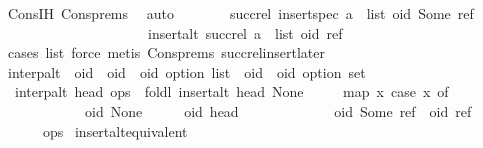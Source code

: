 \begin{isabellebody}
\ Cons{\isachardot}IH\ Cons{\isachardot}prems\ \isamarkupfalse%
\ auto\isanewline
\ \ \ \ \isamarkupfalse%
\ \isamarkupfalse%
\ {\isachardoublequoteopen}succ{\isacharunderscore}rel\ {\isacharparenleft}insert{\isacharunderscore}spec\ {\isacharparenleft}a\ {\isacharhash}\ list{\isacharparenright}\ {\isacharparenleft}oid{\isacharcomma}\ Some\ ref{\isacharparenright}{\isacharparenright}\ {\isacharequal}\isanewline
\ \ \ \ \ \ \ \ \ \ \ \ \ \ \ \ \ \ \ \ \ insert{\isacharunderscore}alt\ {\isacharparenleft}succ{\isacharunderscore}rel\ {\isacharparenleft}a\ {\isacharhash}\ list{\isacharparenright}{\isacharparenright}\ {\isacharparenleft}oid{\isacharcomma}\ ref{\isacharparenright}{\isachardoublequoteclose}\isanewline
\ \ \ \ \ \ \isamarkupfalse%
\ {\isacharparenleft}cases\ list{\isacharcomma}\ force{\isacharcomma}\ metis\ Cons{\isachardot}prems\ succ{\isacharunderscore}rel{\isacharunderscore}insert{\isacharunderscore}later{\isacharparenright}\isanewline
\ \ \isamarkupfalse%
\isanewline
{}\isamarkupfalse%
%
\endisatagproof
{\isafoldproof}%
%
\isadelimproof
\isanewline
%
\endisadelimproof
\isanewline
{}\isamarkupfalse%
\ interp{\isacharunderscore}alt\ {\isacharcolon}{\isacharcolon}\ {\isachardoublequoteopen}{\isacharprime}oid\ {\isasymRightarrow}\ {\isacharparenleft}{\isacharprime}oid\ {\isasymtimes}\ {\isacharprime}oid\ option{\isacharparenright}\ list\ {\isasymRightarrow}\ {\isacharparenleft}{\isacharprime}oid\ {\isasymtimes}\ {\isacharprime}oid\ option{\isacharparenright}\ set{\isachardoublequoteclose}\ \isanewline
\ \ {\isachardoublequoteopen}interp{\isacharunderscore}alt\ head\ ops\ {\isasymequiv}\ foldl\ insert{\isacharunderscore}alt\ {\isacharbraceleft}{\isacharparenleft}head{\isacharcomma}\ None{\isacharparenright}{\isacharbraceright}\isanewline
\ \ \ \ \ {\isacharparenleft}map\ {\isacharparenleft}{\isasymlambda}x{\isachardot}\ case\ x\ of\isanewline
\ \ \ \ \ \ \ \ \ \ \ \ {\isacharparenleft}oid{\isacharcomma}\ None{\isacharparenright}\ \ \ \ \ {\isasymRightarrow}\ {\isacharparenleft}oid{\isacharcomma}\ head{\isacharparenright}\ {\isacharbar}\isanewline
\ \ \ \ \ \ \ \ \ \ \ \ {\isacharparenleft}oid{\isacharcomma}\ Some\ ref{\isacharparenright}\ {\isasymRightarrow}\ {\isacharparenleft}oid{\isacharcomma}\ ref{\isacharparenright}{\isacharparenright}\ \isanewline
\ \ \ \ \ \ ops{\isacharparenright}{\isachardoublequoteclose}\isanewline
\isanewline
{}\isamarkupfalse%
\ insert{\isacharunderscore}alt{\isacharunderscore}equivalent{\isacharcolon}\isanewline

\end{isabellebody}
